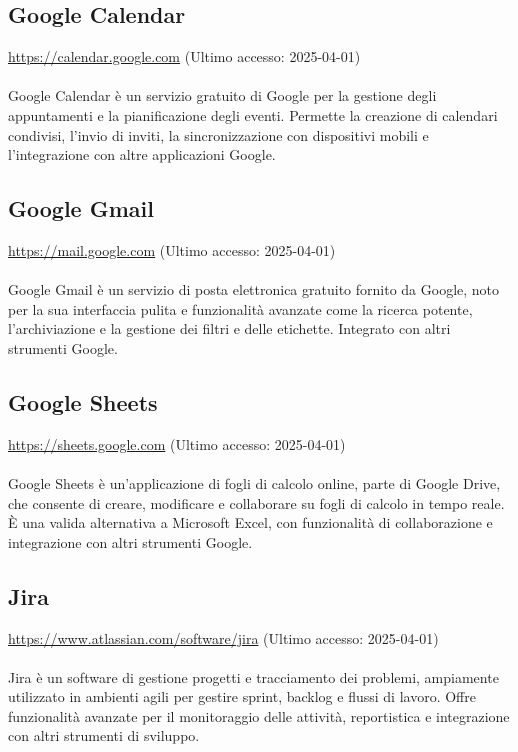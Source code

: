 \subsection{Google Calendar}
\label{Google Calendar}
\href{https://calendar.google.com}{https://calendar.google.com} (Ultimo accesso: 2025-04-01) \\ \\  
Google Calendar è un servizio gratuito di Google per la gestione degli appuntamenti e la pianificazione degli eventi. Permette la creazione di calendari condivisi, l'invio di inviti, la sincronizzazione con dispositivi mobili e l'integrazione con altre applicazioni Google.

\subsection{Google Gmail}
\label{Google Gmail}
\href{https://mail.google.com}{https://mail.google.com} (Ultimo accesso: 2025-04-01) \\ \\  
Google Gmail è un servizio di posta elettronica gratuito fornito da Google, noto per la sua interfaccia pulita e funzionalità avanzate come la ricerca potente, l'archiviazione e la gestione dei filtri e delle etichette. Integrato con altri strumenti Google.

\subsection{Google Sheets}
\label{Google Sheets}
\href{https://sheets.google.com}{https://sheets.google.com} (Ultimo accesso: 2025-04-01) \\ \\  
Google Sheets è un'applicazione di fogli di calcolo online, parte di Google Drive, che consente di creare, modificare e collaborare su fogli di calcolo in tempo reale. È una valida alternativa a Microsoft Excel, con funzionalità di collaborazione e integrazione con altri strumenti Google.

\subsection{Jira}
\label{Jira}
\href{https://www.atlassian.com/software/jira}{https://www.atlassian.com/software/jira} (Ultimo accesso: 2025-04-01) \\ \\  
Jira è un software di gestione progetti e tracciamento dei problemi, ampiamente utilizzato in ambienti agili per gestire sprint, backlog e flussi di lavoro. Offre funzionalità avanzate per il monitoraggio delle attività, reportistica e integrazione con altri strumenti di sviluppo.

